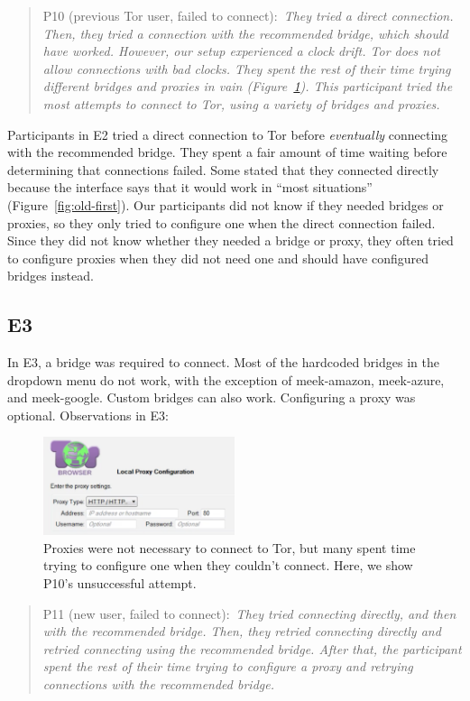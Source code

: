 \documentclass[USenglish,oneside,twocolumn]{article}
\newcommand{\pquote}[2]{
\begin{quotation}
\noindent #1:~\textit{#2}
\end{quotation}
}
\begin{document}
\pquote{P10 (previous Tor user, failed to connect)}{They tried a direct connection. Then, they tried a connection with the recommended bridge, which should have worked. However, our setup experienced a clock drift. Tor does not allow connections with bad clocks. They spent the rest of their time trying different bridges and proxies in vain (Figure~\ref{fig:proxy-attempt}). This participant tried the most attempts to connect to Tor, using a variety of bridges and proxies.}

Participants in E2 tried a direct connection to Tor before {\it eventually} connecting with the recommended bridge.
They spent a fair amount of time waiting before determining that connections failed. Some stated that they connected directly because the interface says that it would work in ``most situations'' (Figure~\ref{fig:old-first}). Our participants did not know if they needed bridges or proxies, so they only tried to configure one when the direct connection failed. Since they did not know whether they needed a bridge or proxy, they often tried to configure proxies when they did not need one and should have configured bridges instead.  

\subsection{E3}
In E3, a bridge was required to connect. Most of the hardcoded bridges in the dropdown menu do not work, with the exception of meek-amazon, meek-azure, and meek-google. Custom bridges can also work. Configuring a proxy was optional.
Observations in E3: 

\begin{figure}[t]
\centering
\includegraphics[width=0.5\textwidth]{P8-proxy-attempt.png}
\caption{
Proxies were not necessary to connect to Tor, but many spent time trying to configure one when they couldn't connect. Here, we show P10's unsuccessful attempt. 
}
\label{fig:proxy-attempt}
\end{figure}

\pquote{P11 (new user, failed to connect)}{They tried connecting directly, and then with the recommended bridge. Then, they retried connecting directly and retried connecting using the recommended bridge. After that, the participant spent the rest of their time trying to configure a proxy and retrying connections with the recommended bridge.}
\end{document}
